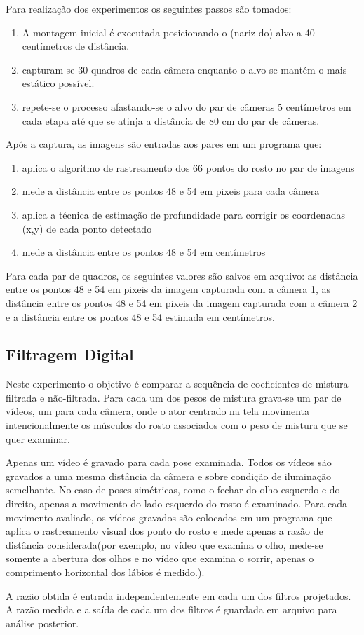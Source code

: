 Para realização dos experimentos os seguintes passos são tomados:

\begin{enumerate}
\item A montagem inicial é executada posicionando o (nariz do) alvo a 40 centímetros de distância.
\item capturam-se 30 quadros de cada câmera enquanto o alvo se mantém o mais estático possível.
\item repete-se o processo afastando-se o alvo do par de câmeras  5 centímetros em cada etapa até que se atinja a distância de 80 cm do par de câmeras.
\end{enumerate}

Após a captura, as imagens são entradas aos pares em um programa que:

\begin{enumerate}
\item aplica o algoritmo de rastreamento dos 66 pontos do rosto no par de imagens
\item mede a distância entre os pontos 48 e 54 em pixeis para cada câmera
\item aplica a técnica de estimação de profundidade para corrigir os coordenadas (x,y) de cada ponto detectado
\item mede a distância entre os pontos 48 e 54 em centímetros
\end{enumerate}

Para cada par de quadros, os seguintes valores são salvos em arquivo: as distância entre os pontos 48 e 54 em pixeis da imagem capturada com a câmera 1, as distância entre os pontos 48 e 54 em pixeis da imagem capturada com a câmera 2 e a distância entre os pontos 48 e 54 estimada em centímetros. 


\subsection{Filtragem Digital}

Neste experimento o objetivo é comparar a sequência de coeficientes de mistura filtrada e não-filtrada.
Para cada um dos pesos de mistura grava-se um par de vídeos, um para cada câmera, onde o ator centrado na tela movimenta intencionalmente os músculos do rosto associados com o peso de mistura que se quer examinar. 

Apenas um vídeo é gravado para cada pose examinada. Todos os vídeos são gravados a uma mesma distância da câmera e sobre condição de iluminação semelhante. No caso de poses simétricas, como o fechar do olho esquerdo e do direito, apenas a movimento do lado esquerdo do rosto é examinado. Para cada movimento avaliado, os vídeos gravados são colocados em um programa que aplica o rastreamento visual dos ponto do rosto e mede apenas a razão de distância considerada(por exemplo, no vídeo que examina o olho, mede-se somente a abertura dos olhos e no vídeo que examina o sorrir, apenas o comprimento horizontal dos lábios é medido.). 

A razão obtida é entrada independentemente em cada um dos filtros projetados. A razão medida e a saída de cada um dos filtros é guardada em arquivo para análise posterior.

